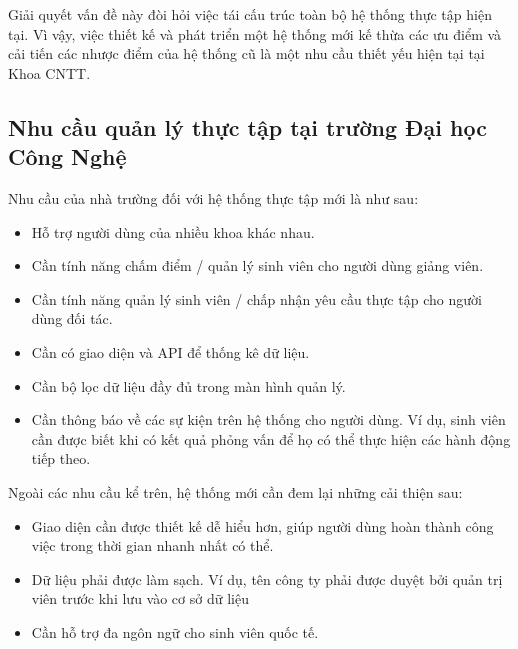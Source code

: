 \documentclass[./../main.tex]{subfiles}
\begin{document}
Giải quyết vấn đề này đòi hỏi việc tái cấu trúc toàn bộ hệ thống thực tập hiện tại. Vì vậy,  việc thiết kế và phát triển một hệ thống mới kế thừa các ưu điểm và cải tiến các nhược điểm của hệ thống cũ là một nhu cầu thiết yếu hiện tại tại Khoa CNTT.

\subsection{Nhu cầu quản lý thực tập tại trường Đại học Công Nghệ}

Nhu cầu của nhà trường đối với hệ thống thực tập mới là như sau:

\begin{itemize}
\item
  
  Hỗ trợ người dùng của nhiều khoa khác nhau.
  
\item
  
  Cần tính năng chấm điểm / quản lý sinh viên cho người dùng giảng viên.
  
\item
  
  Cần tính năng quản lý sinh viên / chấp nhận yêu cầu thực tập cho người
  dùng đối tác.
  
\item
  
  Cần có giao diện và API để thống kê dữ liệu.
  
\item
  
  Cần bộ lọc dữ liệu đầy đủ trong màn hình quản lý.
\item Cần thông báo về các sự kiện trên hệ thống cho người dùng. Ví dụ, sinh viên cần được biết khi có kết quả phỏng vấn để họ có thể thực hiện các hành động tiếp theo.
\end{itemize}

Ngoài các nhu cầu kể trên, hệ thống mới cần đem lại những cải thiện sau:
\begin{itemize}
  \item Giao diện cần được thiết kế dễ hiểu hơn, giúp người dùng hoàn thành
  công việc trong thời gian nhanh nhất có thể.
  \item Dữ liệu phải được làm sạch. Ví dụ, tên công ty phải được duyệt bởi
    quản trị viên trước khi lưu vào cơ sở dữ liệu
  \item Cần hỗ trợ đa ngôn ngữ cho sinh viên quốc tế.
\end{itemize}
\end{document}
